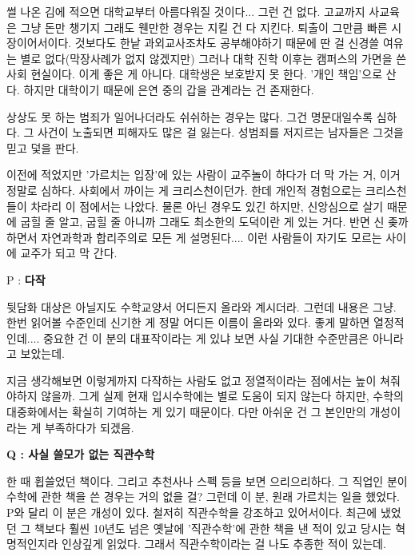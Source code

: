 썰 나온 김에 적으면 대학교부터 아름다워질 것이다... 그런 건 없다.
고교까지 사교육은 그냥 돈만 챙기지 그래도 웬만한 경우는 지킬 건 다 지킨다. 퇴출이 그만큼 빠른 시장이어서이다.
것보다도 한낱 과외교사조차도 공부해야하기 때문에 딴 걸 신경쓸 여유는 별로 없다(막장사례가 없지 않겠지만)
그러나 대학 진학 이후는 캠퍼스의 가면을 쓴 사회 현실이다. 이게 좋은 게 아니다.
대학생은 보호받지 못 한다. '개인 책임'으로 산다. 하지만 대학이기 때문에 은연 중의 갑을 관계라는 건 존재한다.
\vspace{5mm}

상상도 못 하는 범죄가 일어나더라도 쉬쉬하는 경우는 많다. 그건 명문대일수록 심하다.
그 사건이 노출되면 피해자도 많은 걸 잃는다. 성범죄를 저지르는 남자들은 그것을 믿고 덫을 판다.
\vspace{5mm}

이전에 적었지만 '가르치는 입장'에 있는 사람이 교주놀이 하다가 더 막 가는 거, 이거 정말로 심하다.
사회에서 까이는 게 크리스천이던가. 한데 개인적 경험으로는 크리스천들이 차라리 이 점에서는 나았다.
물론 아닌 경우도 있긴 하지만, 신앙심으로 살기 때문에 굽힐 줄 알고, 굽힐 줄 아니까 그래도 최소한의 도덕이란 게 있는 거다.
반면 신 좆까 하면서 자연과학과 합리주의로 모든 게 설명된다.... 이런 사람들이 자기도 모르는 사이에 교주가 되고 막 간다.
\vspace{5mm}

P : \textbf{다작}
\vspace{5mm}

뒷담화 대상은 아닐지도 수학교양서 어디든지 올라와 계시더라.
그런데 내용은 그냥. 한번 읽어볼 수준인데 신기한 게 정말 어디든 이름이 올라와 있다.
좋게 말하면 열정적인데.... 중요한 건 이 분의 대표작이라는 게 있냐 보면 사실 기대한 수준만큼은 아니라고 보았는데.
\vspace{5mm}

지금 생각해보면 이렇게까지 다작하는 사람도 없고 정열적이라는 점에서는 높이 쳐줘야하지 않을까.
그게 실제 현재 입시수학에는 별로 도움이 되지 않는다 하지만, 수학의 대중화에서는 확실히 기여하는 게 있기 때문이다.
다만 아쉬운 건 그 본인만의 개성이라는 게 부족하다가 되겠음.
\vspace{5mm}

\textbf{Q : 사실 쓸모가 없는 직관수학}
\vspace{5mm}

한 때 휩쓸었던 책이다. 그리고 추천사나 스펙 등을 보면 으리으리하다.
그 직업인 분이 수학에 관한 책을 쓴 경우는 거의 없을 걸? 그런데 이 분, 원래 가르치는 일을 했었다.
P와 달리 이 분은 개성이 있다. 철저히 직관수학을 강조하고 있어서이다.
최근에 냈었던 그 책보다 훨씬 10년도 넘은 옛날에 '직관수학'에 관한 책을 낸 적이 있고 당시는 혁명적인지라 인상깊게 읽었다.
그래서 직관수학이라는 걸 나도 추종한 적이 있는데.
\vspace{5mm}

